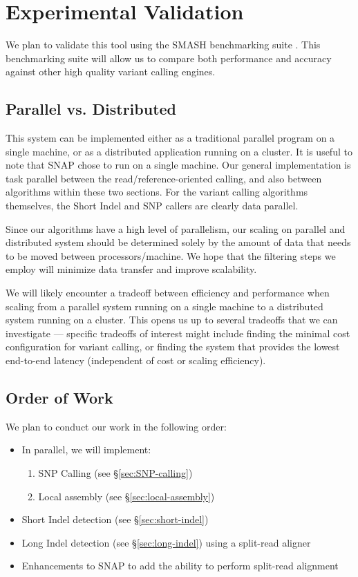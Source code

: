 \documentclass[11pt]{article}
\begin{document}
\section{Experimental Validation}
\label{sec:experimental-validation}

We plan to validate this tool using the SMASH benchmarking suite \cite{talwalkar13}. This benchmarking suite will allow us to
compare both performance and accuracy against other high quality variant calling engines.

\subsection{Parallel vs. Distributed}
\label{sec:parallel-vs-distributed}

This system can be implemented either as a traditional parallel program on a single machine, or as a distributed application
running on a cluster. It is useful to note that SNAP \cite{zaharia11} chose to run on a single machine. Our general implementation
is task parallel between the read/reference-oriented calling, and also between algorithms within these two sections. For the
variant calling algorithms themselves, the Short Indel and SNP callers are clearly data parallel.

Since our algorithms have a high level of parallelism, our scaling on parallel and distributed system should be determined solely
by the amount of data that needs to be moved between processors/machine. We hope that the filtering steps we employ will
minimize data transfer and improve scalability.

We will likely encounter a tradeoff between efficiency and performance when scaling from a parallel system running on a single
machine to a distributed system running on a cluster. This opens us up to several tradeoffs that we can investigate --- specific
tradeoffs of interest might include finding the minimal cost configuration for variant calling, or finding the system that provides
the lowest end-to-end latency (independent of cost or scaling efficiency).

\subsection{Order of Work}
\label{sec:order-of-work}

We plan to conduct our work in the following order:

\begin{itemize}
\item In parallel, we will implement:
\begin{enumerate}
\item SNP Calling (see \S\ref{sec:SNP-calling})
\item Local assembly (see \S\ref{sec:local-assembly})
\end{enumerate}
\item Short Indel detection (see \S\ref{sec:short-indel})
\item Long Indel detection (see \S\ref{sec:long-indel}) using a split-read aligner
\item Enhancements to SNAP to add the ability to perform split-read alignment
\end{itemize}

\small




\end{document}

